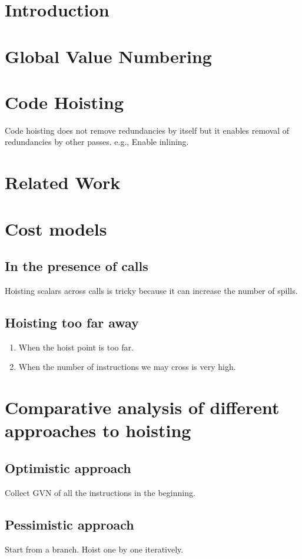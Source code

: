 \section{Introduction}

\section{Global Value Numbering}
\section{Code Hoisting}
Code hoisting does not remove redundancies by itself but it enables removal of redundancies by other passes.
e.g., Enable inlining.
\section{Related Work}




\section{Cost models}
\subsection{In the presence of calls}
Hoisting scalars across calls is tricky because it can increase the number of spills.

\subsection{Hoisting too far away}
\begin{enumerate}
\item When the hoist point is too far.
\item When the number of instructions we may cross is very high.
\end{enumerate}

\section{Comparative analysis of different approaches to hoisting}
\subsection{Optimistic approach}
Collect GVN of all the instructions in the beginning.
\subsection{Pessimistic approach}
Start from a branch. Hoist one by one iteratively.
